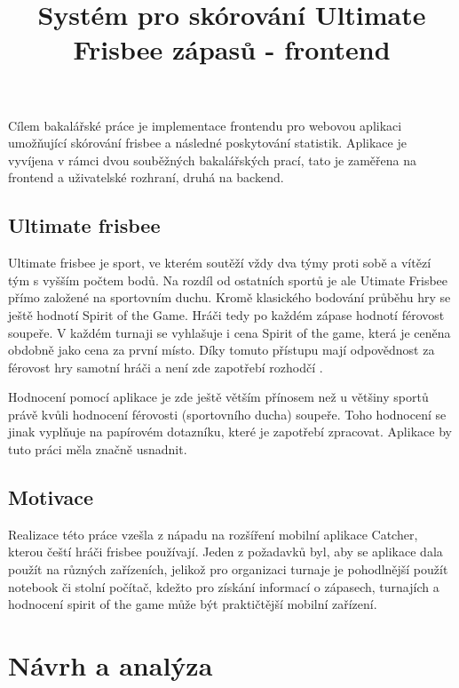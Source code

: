 \documentclass[thesis=B,czech]{FITthesis}[2012/06/26]
\title{Systém pro skórování Ultimate Frisbee zápasů - frontend}
\begin{document}

\begin{introduction}
	Cílem bakalářské práce je implementace frontendu pro webovou aplikaci umožňující skórování frisbee a následné poskytování statistik. Aplikace je vyvíjena v rámci dvou souběžných bakalářských prací, tato je zaměřena na frontend a uživatelské rozhraní, druhá na backend.

	\section{Ultimate frisbee}

	Ultimate frisbee je sport, ve kterém soutěží vždy dva týmy proti sobě a vítězí tým s vyšším počtem bodů. Na rozdíl od ostatních sportů je ale Utimate Frisbee přímo založené na sportovním duchu. Kromě klasického bodování průběhu hry se ještě hodnotí Spirit of the Game. Hráči tedy po každém zápase hodnotí férovost soupeře. V každém turnaji se vyhlašuje i cena Spirit of the game, která je ceněna obdobně jako cena za první místo. Díky tomuto přístupu mají odpovědnost za férovost hry samotní hráči a není zde zapotřebí rozhodčí \cite{frisbee}.

	Hodnocení pomocí aplikace je zde ještě větším přínosem než u většiny sportů právě kvůli hodnocení férovosti (sportovního ducha) soupeře. Toho hodnocení se jinak vyplňuje na papírovém dotazníku, které je zapotřebí zpracovat. Aplikace by tuto práci měla značně usnadnit.

	\section{Motivace}

	Realizace této práce vzešla z nápadu na rozšíření mobilní aplikace Catcher, kterou čeští hráči frisbee používají. 
	Jeden z požadavků byl, aby se aplikace dala použít na různých zařízeních, jelikož pro organizaci turnaje je pohodlnější použít notebook či stolní počítač, kdežto pro získání informací o zápasech, turnajích a hodnocení spirit of the game může být praktičtější mobilní zařízení.

\end{introduction}

\chapter{Návrh a analýza}
	
\end{document}
